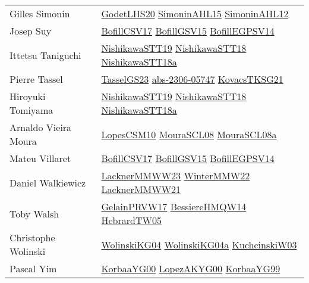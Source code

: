 {\begin{longtable}{p{4cm}p{20cm}}
Gilles Simonin & \href{papers/GodetLHS20.pdf}{GodetLHS20}\cite{GodetLHS20} \href{articles/SimoninAHL15.pdf}{SimoninAHL15}\cite{SimoninAHL15} \href{papers/SimoninAHL12.pdf}{SimoninAHL12}\cite{SimoninAHL12} \\
Josep Suy & \href{papers/BofillCSV17.pdf}{BofillCSV17}\cite{BofillCSV17} \href{papers/BofillGSV15.pdf}{BofillGSV15}\cite{BofillGSV15} \href{papers/BofillEGPSV14.pdf}{BofillEGPSV14}\cite{BofillEGPSV14} \\
Ittetsu Taniguchi & \href{}{NishikawaSTT19}\cite{NishikawaSTT19} \href{papers/NishikawaSTT18.pdf}{NishikawaSTT18}\cite{NishikawaSTT18} \href{papers/NishikawaSTT18a.pdf}{NishikawaSTT18a}\cite{NishikawaSTT18a} \\
Pierre Tassel & \href{papers/TasselGS23.pdf}{TasselGS23}\cite{TasselGS23} \href{articles/abs-2306-05747.pdf}{abs-2306-05747}\cite{abs-2306-05747} \href{papers/KovacsTKSG21.pdf}{KovacsTKSG21}\cite{KovacsTKSG21} \\
Hiroyuki Tomiyama & \href{}{NishikawaSTT19}\cite{NishikawaSTT19} \href{papers/NishikawaSTT18.pdf}{NishikawaSTT18}\cite{NishikawaSTT18} \href{papers/NishikawaSTT18a.pdf}{NishikawaSTT18a}\cite{NishikawaSTT18a} \\
Arnaldo Vieira Moura & \href{articles/LopesCSM10.pdf}{LopesCSM10}\cite{LopesCSM10} \href{papers/MouraSCL08.pdf}{MouraSCL08}\cite{MouraSCL08} \href{papers/MouraSCL08a.pdf}{MouraSCL08a}\cite{MouraSCL08a} \\
Mateu Villaret & \href{papers/BofillCSV17.pdf}{BofillCSV17}\cite{BofillCSV17} \href{papers/BofillGSV15.pdf}{BofillGSV15}\cite{BofillGSV15} \href{papers/BofillEGPSV14.pdf}{BofillEGPSV14}\cite{BofillEGPSV14} \\
Daniel Walkiewicz & \href{articles/LacknerMMWW23.pdf}{LacknerMMWW23}\cite{LacknerMMWW23} \href{papers/WinterMMW22.pdf}{WinterMMW22}\cite{WinterMMW22} \href{papers/LacknerMMWW21.pdf}{LacknerMMWW21}\cite{LacknerMMWW21} \\
Toby Walsh & \href{papers/GelainPRVW17.pdf}{GelainPRVW17}\cite{GelainPRVW17} \href{papers/BessiereHMQW14.pdf}{BessiereHMQW14}\cite{BessiereHMQW14} \href{papers/HebrardTW05.pdf}{HebrardTW05}\cite{HebrardTW05} \\
Christophe Wolinski & \href{papers/WolinskiKG04.pdf}{WolinskiKG04}\cite{WolinskiKG04} \href{}{WolinskiKG04a}\cite{WolinskiKG04a} \href{articles/KuchcinskiW03.pdf}{KuchcinskiW03}\cite{KuchcinskiW03} \\
Pascal Yim & \href{articles/KorbaaYG00.pdf}{KorbaaYG00}\cite{KorbaaYG00} \href{articles/LopezAKYG00.pdf}{LopezAKYG00}\cite{LopezAKYG00} \href{papers/KorbaaYG99.pdf}{KorbaaYG99}\cite{KorbaaYG99} \\

\end{longtable}}
